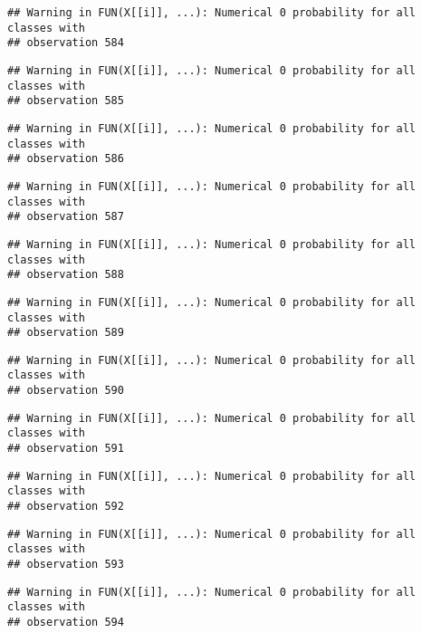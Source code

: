 \documentclass[
]{article}
\begin{document}
\begin{verbatim}
## Warning in FUN(X[[i]], ...): Numerical 0 probability for all classes with
## observation 584
\end{verbatim}

\begin{verbatim}
## Warning in FUN(X[[i]], ...): Numerical 0 probability for all classes with
## observation 585
\end{verbatim}

\begin{verbatim}
## Warning in FUN(X[[i]], ...): Numerical 0 probability for all classes with
## observation 586
\end{verbatim}

\begin{verbatim}
## Warning in FUN(X[[i]], ...): Numerical 0 probability for all classes with
## observation 587
\end{verbatim}

\begin{verbatim}
## Warning in FUN(X[[i]], ...): Numerical 0 probability for all classes with
## observation 588
\end{verbatim}

\begin{verbatim}
## Warning in FUN(X[[i]], ...): Numerical 0 probability for all classes with
## observation 589
\end{verbatim}

\begin{verbatim}
## Warning in FUN(X[[i]], ...): Numerical 0 probability for all classes with
## observation 590
\end{verbatim}

\begin{verbatim}
## Warning in FUN(X[[i]], ...): Numerical 0 probability for all classes with
## observation 591
\end{verbatim}

\begin{verbatim}
## Warning in FUN(X[[i]], ...): Numerical 0 probability for all classes with
## observation 592
\end{verbatim}

\begin{verbatim}
## Warning in FUN(X[[i]], ...): Numerical 0 probability for all classes with
## observation 593
\end{verbatim}

\begin{verbatim}
## Warning in FUN(X[[i]], ...): Numerical 0 probability for all classes with
## observation 594
\end{verbatim}
\end{document}
